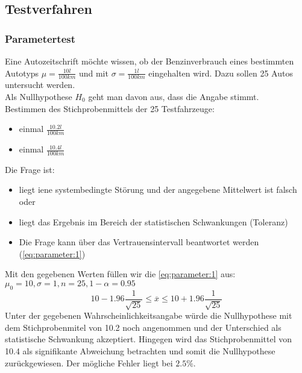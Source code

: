 \subsection{Testverfahren}
\subsubsection{Parametertest}
Eine Autozeitschrift möchte wissen, ob der Benzinverbrauch eines bestimmten Autotyps $\mu=\frac{10l}{100km}$ und mit $\sigma=\frac{1l}{100km}$ eingehalten wird. Dazu sollen 25 Autos untersucht werden.\\
Als Nullhypothese $H_0$ geht man davon aus, dass die Angabe stimmt.\\
Bestimmen des Stichprobenmittels der 25 Testfahrzeuge:
\begin{itemize}
\item einmal $\frac{10.2l}{100km}$ 
\item einmal $\frac{10.4l}{100km}$
\end{itemize}
Die Frage ist: 
\begin{itemize}
\item liegt iene systembedingte Störung und der angegebene Mittelwert ist falsch oder
\item liegt das Ergebnis im Bereich der statistischen Schwankungen (Toleranz)
\item Die Frage kann über das Vertrauensintervall beantwortet werden (\autoref{eq:parameter:1})
\end{itemize}
Mit den gegebenen Werten füllen wir die \autoref{eq:parameter:1} aus: $\mu_{0}=10, \sigma=1, n=25, 1-\alpha=0.95$
\begin{equation*}
10-1.96\frac{1}{\sqrt{25}}\leq\overline{x}\leq10+1.96\frac{1}{\sqrt{25}}
\end{equation*}
Unter der gegebenen Wahrscheinlichkeitsangabe würde die Nullhypothese mit dem Stichprobenmitel von 10.2 noch angenommen und der Unterschied als statistische Schwankung akzeptiert. Hingegen wird das Stichprobenmittel von 10.4 als signifikante Abweichung betrachten und somit die Nullhypothese zurückgewiesen. Der mögliche Fehler liegt bei $2.5\%$.
